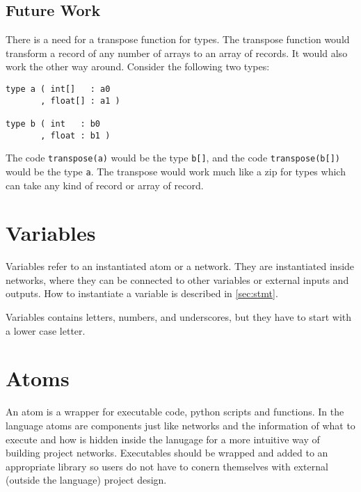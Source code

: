 


\subsection{Future Work}
There is a need for a transpose function for types. The transpose
function would transform a record of any number of arrays to an array
of records. It would also work the other way around. Consider the
following two types:

\begin{verbatim}
type a ( int[]   : a0
       , float[] : a1 )

type b ( int   : b0
       , float : b1 )
\end{verbatim}

The code \verb#transpose(a)# would be the type \verb#b[]#, and the
code \verb#transpose(b[])# would be the type \verb#a#. The transpose
would work much like a zip for types which can take any kind of record
or array of record.

\section{Variables}
Variables refer to an instantiated atom or a network. They are
instantiated inside networks, where they can be connected to other
variables or external inputs and outputs. How to instantiate a
variable is described in \autoref{sec:stmt}.

Variables contains letters, numbers, and underscores, but they have to
start with a lower case letter.

\section{Atoms}\label{sec:atom}
An atom is a wrapper for executable code, python scripts and
functions. In the language atoms are components just like networks and
the information of what to execute and how is hidden inside the
lanugage for a more intuitive way of building project
networks. Executables should be wrapped and added to an appropriate
library so users do not have to conern themselves with external
(outside the language) project design.

